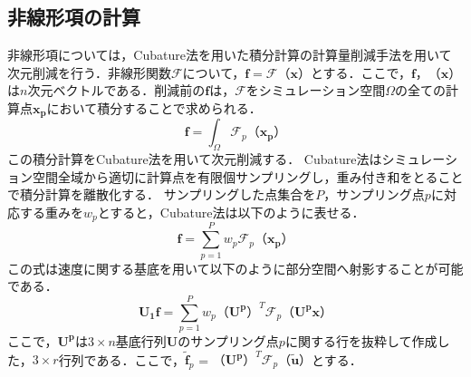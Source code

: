 \documentclass[a4j,12pt]{jreport}
\begin{document}
\subsection{非線形項の計算}\label{noLinear}
非線形項については，Cubature法を用いた積分計算の計算量削減手法を用いて次元削減を行う．非線形関数$\mathcal{F}$について，$\bm{f} = \mathcal{F}（\bm{x}）$とする．ここで，$\bm{f}$，$（\bm{x}）$は$n$次元ベクトルである．削減前の$\bm{f}$は，$\mathcal{F}$をシミュレーション空間$\Omega$の全ての計算点$\bm{x_p}$において積分することで求められる．
\[
	\bm{f} = \int_\Omega\mathcal{F}_p（\bm{x_p}）
\]
この積分計算をCubature法を用いて次元削減する．
Cubature法はシミュレーション空間全域から適切に計算点を有限個サンプリングし，重み付き和をとることで積分計算を離散化する．
サンプリングした点集合を$P$，サンプリング点$p$に対応する重みを$w_p$とすると，Cubature法は以下のように表せる．
\[
	\bm{f} = \sum_{p=1}^Pw_p\mathcal{F}_p（\bm{x_p}）
\]
この式は速度に関する基底を用いて以下のように部分空間へ射影することが可能である．
\[
	\mathbf{U_1}\bm{f} = \sum_{p=1}^Pw_p（\mathbf{U^p}）^T\mathcal{F}_p（\mathbf{U^p}\bm{x}）
\]
ここで，$\mathbf{U^p}$は$3 \times n$基底行列$\mathbf{U}$のサンプリング点$p$に関する行を抜粋して作成した，$3 \times r$行列である．ここで，$\bm{\tilde{f}}_p$ = $（\mathbf{U^p}）^T\mathcal{F}_p（\bm{\tilde{u}}）$とする．
\end{document}
